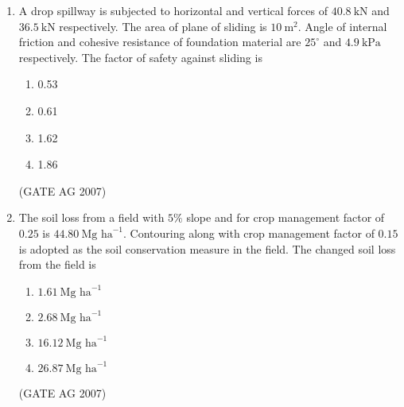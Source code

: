 \documentclass[journal,12pt,onecolumn]{IEEEtran}
\theoremstyle{remark}
\begin{document}
\begin{enumerate}[label=Q\arabic*:]
In this watershed, $2.0\ \text{km}^2$ area has cultivated sandy soil $(C = 0.2)$ and the remaining $3.0\ \text{km}^2$ has cultivated clay soil $(C = 0.7)$. The peak rate of runoff from the watershed is
\begin{multicols}{4}
\begin{enumerate}
\item $4.29\ \text{m}^3\ \text{s}^{-1}$
\item $5.41\ \text{m}^3\ \text{s}^{-1}$
\item $42.99\ \text{m}^3\ \text{s}^{-1}$
\item $54.13\ \text{m}^3\ \text{s}^{-1}$
\end{enumerate}
\end{multicols}
\hfill(GATE AG 2007)

\item A drop spillway is subjected to horizontal and vertical forces of $40.8\ \text{kN}$ and $36.5\ \text{kN}$ respectively. The area of plane of sliding is $10\ \text{m}^2$. Angle of internal friction and cohesive resistance of foundation material are $25^\circ$ and $4.9\ \text{kPa}$ respectively. The factor of safety against sliding is
\begin{multicols}{4}
\begin{enumerate}
\item 0.53
\item 0.61
\item 1.62
\item 1.86
\end{enumerate}
\end{multicols}
\hfill(GATE AG 2007)

\item The soil loss from a field with $5\%$ slope and for crop management factor of $0.25$ is $44.80\ \text{Mg ha}^{-1}$. Contouring along with crop management factor of $0.15$ is adopted as the soil conservation measure in the field. The changed soil loss from the field is
\begin{multicols}{4}
\begin{enumerate}
\item $1.61\ \text{Mg ha}^{-1}$
\item $2.68\ \text{Mg ha}^{-1}$
\item $16.12\ \text{Mg ha}^{-1}$
\item $26.87\ \text{Mg ha}^{-1}$
\end{enumerate}
\end{multicols}
\hfill(GATE AG 2007)


\end{enumerate}
\end{document}
